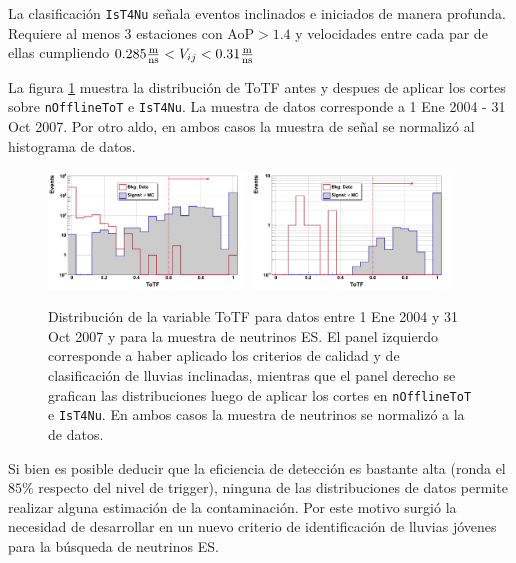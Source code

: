 	La clasificación \texttt{IsT4Nu} señala eventos inclinados e iniciados de manera profunda. Requiere al menos 3 estaciones con AoP$>1.4$ y velocidades entre cada par de ellas cumpliendo $0.285{\rm \frac{m}{ns}}<V_{ij}<0.31{\rm \frac{m}{ns}}$

	La figura \ref{fig:totFES} muestra la distribución de ToTF antes y despues de aplicar los cortes sobre \texttt{nOfflineToT} e \texttt{IsT4Nu}.
	La muestra de datos corresponde a 1 Ene 2004 - 31 Oct 2007. Por otro aldo, en ambos casos la muestra de señal se normalizó al histograma de datos.
	\begin{figure}[ht]
	\begin{center}
	\includegraphics[width=0.47\textwidth]{fig/seleccionAuger/ToTF_forThesis}\hfill
	\includegraphics[width=0.47\textwidth]{fig/seleccionAuger/ToTF_with_noToT_and_hasTriangle_forThesis}
	\caption{Distribución de la variable ToTF para datos entre 1 Ene 2004 y 31 Oct 2007 y para la muestra de neutrinos ES. El panel izquierdo corresponde a haber aplicado los criterios de calidad y de clasificación de lluvias inclinadas, mientras que el panel derecho se grafican las distribuciones luego de aplicar los cortes en \texttt{nOfflineToT} e \texttt{IsT4Nu}. En ambos casos la muestra de neutrinos se normalizó a la de datos.}
	\label{fig:totFES}
	\end{center}
	\end{figure}
	
	Si bien es posible deducir que la eficiencia de detección es bastante alta (ronda el $85\%$ respecto del nivel de trigger), ninguna de las distribuciones de datos permite realizar alguna estimación de la contaminación.
	Por este motivo surgió la necesidad de desarrollar en un nuevo criterio de identificación de lluvias jóvenes para la búsqueda de neutrinos ES.
	
